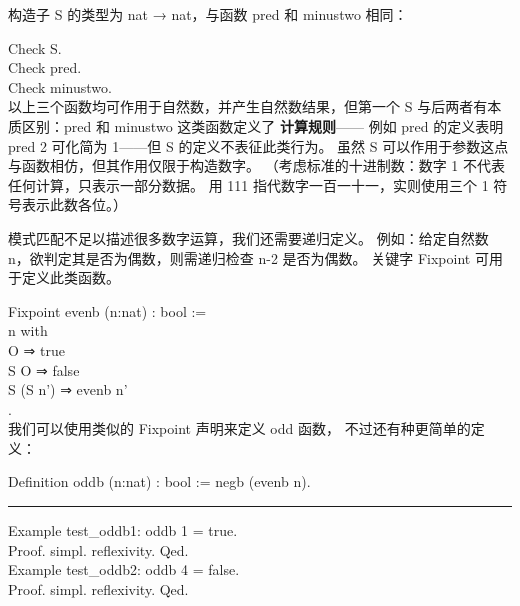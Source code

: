 \documentclass[utf8]{ctexart}
\begin{document}
构造子 {{S}} 的类型为 {{nat}} {→} {{nat}}，与函数 {{pred}} 和
{{minustwo}} 相同：

{Check} {S}.\\
{Check} {pred}.\\
{Check} {minustwo}.\\

以上三个函数均可作用于自然数，并产生自然数结果，但第一个 {{S}}
与后两者有本质区别：{{pred}} 和 {{minustwo}} 这类函数定义了
\textbf{计算规则}------ 例如 {{pred}} 的定义表明 {{pred}} {2} 可化简为
{1}------但 {{S}} 的定义不表征此类行为。 虽然 {{S}}
可以作用于参数这点与函数相仿，但其作用仅限于构造数字。
（考虑标准的十进制数：数字 {1} 不代表任何计算，只表示一部分数据。 用
{111} 指代数字一百一十一，实则使用三个 {1} 符号表示此数各位。）

模式匹配不足以描述很多数字运算，我们还需要递归定义。 例如：给定自然数
{{n}}，欲判定其是否为偶数，则需递归检查 {{n}-2} 是否为偶数。 关键字
{{Fixpoint}} 可用于定义此类函数。

{Fixpoint} {evenb} ({n}:{nat}) : {bool} :=\\
\hspace*{0.333em}\hspace*{0.333em}{match} {n} {with}\\
\hspace*{0.333em}\hspace*{0.333em}\textbar{} {O} ⇒ {true}\\
\hspace*{0.333em}\hspace*{0.333em}\textbar{} {S} {O} ⇒ {false}\\
\hspace*{0.333em}\hspace*{0.333em}\textbar{} {S} ({S} {n'}) ⇒ {evenb}
{n'}\\
\hspace*{0.333em}\hspace*{0.333em}{end}.\\

我们可以使用类似的 {{Fixpoint}} 声明来定义 {{odd}} 函数，
不过还有种更简单的定义：

{Definition} {oddb} ({n}:{nat}) : {bool} := {negb} ({evenb} {n}).\\

\begin{center}\rule{0.5\linewidth}{\linethickness}\end{center}

{Example} {test\_oddb1}: {oddb} 1 = {true}.\\
{Proof}. {simpl}. {reflexivity}. {Qed}.\\
{Example} {test\_oddb2}: {oddb} 4 = {false}.\\
{Proof}. {simpl}. {reflexivity}. {Qed}.\\
\end{document}
